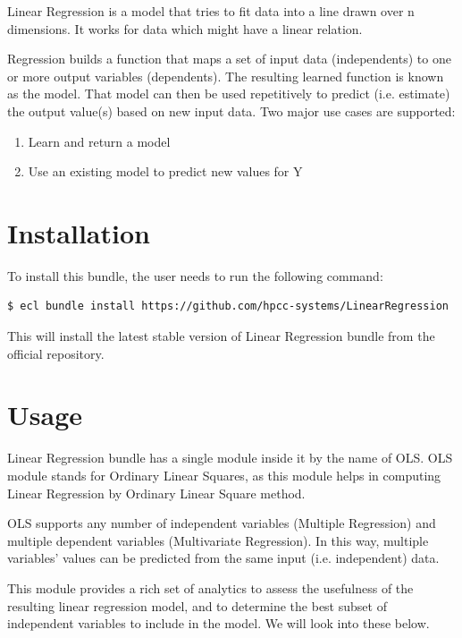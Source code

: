Linear Regression is a model that tries to fit data into a line drawn over n dimensions. It works for data which might have a linear relation.

Regression builds a function that maps a set of input data (independents) to one or more output variables (dependents). The resulting learned function is known as the model. That model can then be used repetitively to predict (i.e. estimate) the output value(s) based on new input data. Two major use cases are supported:

\begin{enumerate}
    \item Learn and return a model
    \item Use an existing model to predict new values for Y
\end{enumerate}

\section{Installation}

To install this bundle, the user needs to run the following command:

\begin{lstlisting}[language=bash]
$ ecl bundle install https://github.com/hpcc-systems/LinearRegression
\end{lstlisting}

This will install the latest stable version of Linear Regression bundle from the official repository.

\section{Usage}

Linear Regression bundle has a single module inside it by the name of OLS. OLS module stands for Ordinary Linear Squares, as this module helps in computing Linear Regression by Ordinary Linear Square method.

OLS supports any number of independent variables (Multiple Regression) and multiple dependent variables (Multivariate Regression). In this way, multiple variables’ values can be predicted from the same input (i.e. independent) data.

This module provides a rich set of analytics to assess the usefulness of the resulting linear regression model, and to determine the best subset of independent variables to include in the model. We will look into these below.


